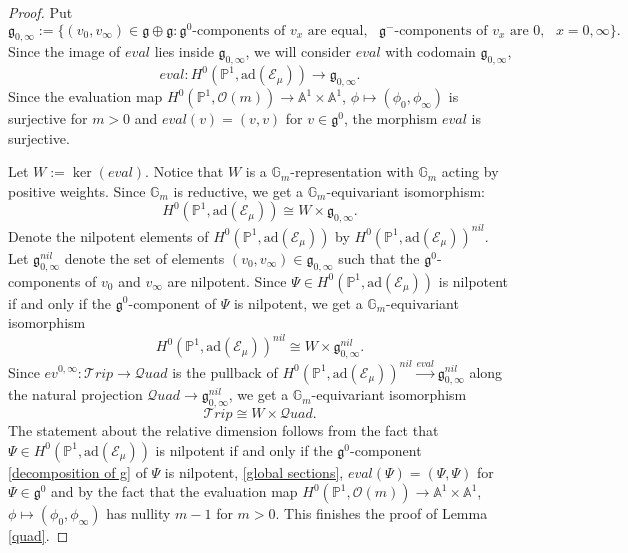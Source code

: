 \documentclass{amsart}
\newcommand{\cE}{\mathcal{E}}
\newcommand{\cQuad}{\mathcal{Q}uad}
\newcommand{\gm}{\mathbb{G}_{m}}
\theoremstyle{plain}
\theoremstyle{definition}
\theoremstyle{remark}
\begin{document}
\begin{proof}
Put
\[
\mathfrak{g}_{0,\infty}:=\{(v_{0},v_{\infty})\in\mathfrak{g}\oplus\mathfrak{g}:\mathfrak{g}^{0}\text{-components of }
v_{x}\text{ are equal},
 \text{ }\mathfrak{g}^{-}\text{-components of }v_{x} \text{ are } 0, \text{ }x=0,\infty\}.
\]
Since the image of $eval$ lies inside $\mathfrak{g}_{0,\infty}$,
we will consider $eval$ with codomain $\mathfrak{g}_{0,\infty}$,
\[
eval:H^{0}(\mathbb{P}^{1},\text{ad}(\cE_{\mu}))
\rightarrow \mathfrak{g}_{0,\infty}.
\]
Since the evaluation map $H^{0}(\mathbb{P}^{1},\mathcal{O}(m))\rightarrow\mathbb{A}^{1}\times\mathbb{A}^{1}$, $\phi\mapsto(\phi_{0},\phi_{\infty})$ is surjective for $m>0$ and $eval(v)=(v,v)$ for $v\in\mathfrak{g}^0$, the morphism $eval$ is surjective. 

Let $W:=\ker(eval)$. Notice that $W$ is a $\gm$-representation with $\gm$ acting by positive weights. Since $\gm$ is reductive, we get a $\gm$-equivariant isomorphism:
\[
H^{0}(\mathbb{P}^{1},\text{ad}(\cE_{\mu}))\cong W\times\mathfrak{g}_{0,\infty}.
\]
Denote the nilpotent elements of $H^{0}(\mathbb{P}^{1},\text{ad}(\cE_\mu))$ by $H^{0}(\mathbb{P}^{1},\text{ad}(\cE_\mu))^{nil}$. 
Let $\mathfrak{g}^{nil}_{0,\infty}$ denote the set of elements $(v_{0},v_{\infty})\in\mathfrak{g}_{0,\infty}$ such that the $\mathfrak{g}^{0}$-components of $v_{0}$ and $v_{\infty}$ are nilpotent.
Since $\Psi\in H^{0}(\mathbb{P}^{1},\text{ad}(\cE_\mu))$ is nilpotent if and only if the $\mathfrak{g}^{0}$-component of $\Psi$ is nilpotent, 
we get a $\gm$-equivariant isomorphism
\[
     H^{0}(\mathbb{P}^{1},\text{ad}(\cE_\mu))^{nil}\cong W\times\mathfrak{g}^{nil}_{0,\infty}.
\]
Since
$ev^{0,\infty} : \mathcal{T}rip\rightarrow \cQuad$ is the pullback of $H^{0}(\mathbb{P}^{1},\text{ad}(\cE_\mu))^{nil}\xrightarrow{eval} \mathfrak{g}^{nil}_{0,\infty}$ along the natural projection $\cQuad\rightarrow\mathfrak{g}_{0,\infty}^{nil}$, 
we get a $\gm$-equivariant isomorphism
\[
\mathcal{T}rip\cong W\times\cQuad.
\]
The statement about the relative dimension follows from the fact that $\Psi\in H^{0}(\mathbb{P}^{1},\text{ad}(\cE_\mu))$ is nilpotent if and only if the $\mathfrak{g}^{0}$-component \eqref{decomposition of g} of $\Psi$ is nilpotent, \eqref{global sections}, $eval(\Psi)=(\Psi,\Psi)$ for $\Psi\in\mathfrak{g}^{0}$ and by the fact that the evaluation map $H^{0}(\mathbb{P}^{1},\mathcal{O}(m))\rightarrow\mathbb{A}^{1}\times\mathbb{A}^{1}$, $\phi\mapsto(\phi_{0},\phi_{\infty})$ has nullity $m-1$ for $m>0$.
This finishes the proof of Lemma \ref{quad}.
\end{proof}
\end{document}
